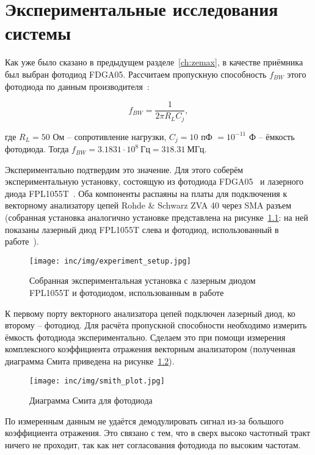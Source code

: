 \chapter{Экспериментальные исследования системы}
\label{ch:experiment}

Как уже было сказано в предыдущем разделе~\ref{ch:zemax}, в качестве приёмника был выбран фотодиод FDGA05. Рассчитаем пропускную способность $f_{BW}$ этого фотодиода по данным производителя~\cite{PDThorlabs}:

\begin{equation}
    f_{BW} = \frac{1}{2\pi R_L C_j},
\end{equation}

где $R_L = 50$ Ом \--- сопротивление нагрузки, $C_j = 10$ пФ $= 10^{-11}$ Ф \--- ёмкость фотодиода. Тогда $f_{BW} = 3.1831 \cdot 10^8~\text{Гц} = 318.31~\text{МГц}$.

Экспериментально подтвердим это значение. Для этого соберём экспериментальную установку, состоящую из фотодиода FDGA05~\cite{PDThorlabs} и лазерного диода FPL1055T~\cite{LDThorlabs}. Оба компоненты распаяны на платы для подключения к векторному анализатору цепей Rohde & Schwarz ZVA 40 через SMA разъем (собранная установка аналогично установке представлена на рисунке~\ref{fig:experiment_setup_photo}: на ней показаны лазерный диод FPL1055T слева и фотодиод, использованный в работе~\cite{Kozyreva2019}).

\begin{figure}[!h]
    \centering
    \texttt{[image: inc/img/experiment\_setup.jpg]}
    \caption{Собранная экспериментальная установка с лазерным диодом FPL1055T и фотодиодом, использованным в работе~\cite{Kozyreva2019}}
    \label{fig:experiment_setup_photo}
\end{figure}

К первому порту векторного анализатора цепей подключен лазерный диод, ко второму \--- фотодиод. Для расчёта пропускной способности необходимо измерить ёмкость фотодиода экспериментально. Сделаем это при помощи измерения комплексного коэффициента отражения векторным анализатором (полученная диаграмма Смита приведена на рисунке~\ref{fig:smith_plot}).

\begin{figure}[!h]
    \centering
    \texttt{[image: inc/img/smith\_plot.jpg]}
    \caption{Диаграмма Смита для фотодиода}
    \label{fig:smith_plot}
\end{figure}

По измеренным данным не удаётся демодулировать сигнал из-за большого коэффициента отражения. Это связано с тем, что в сверх высоко частотный тракт ничего не проходит, так как нет согласования фотодиода по высоким частотам. %